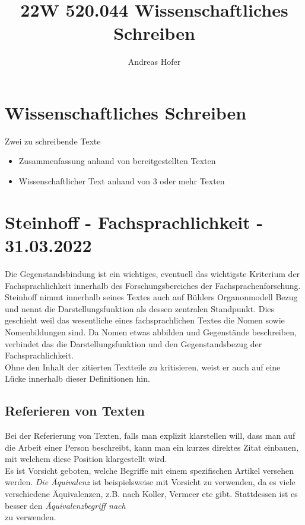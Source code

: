 \documentclass{article}
\title{22W 520.044 Wissenschaftliches Schreiben}
\author{Andreas Hofer}
\begin{document}
	\section{Wissenschaftliches Schreiben}
	Zwei zu schreibende Texte

	\begin{itemize}
		\item{Zusammenfassung anhand von bereitgestellten Texten}
		\item{Wissenschaftlicher Text anhand von 3 oder mehr Texten}
	\end{itemize}

	\section{Steinhoff - Fachsprachlichkeit - 31.03.2022}
	Die Gegenstandsbindung ist ein wichtiges, eventuell das wichtigste Kriterium der Fachsprachlichkeit innerhalb des Forschungsbereiches der Fachsprachenforschung. \\
	Steinhoff nimmt innerhalb seines Textes auch auf Bühlers Organonmodell Bezug und nennt die Darstellungsfunktion als dessen zentralen Standpunkt. Dies geschieht weil das wesentliche eines fachsprachlichen Textes die Nomen sowie Nomenbildungen sind. Da Nomen etwas abbilden und Gegenstände beschreiben, verbindet das die Darstellungsfunktion und den Gegenstandsbezug der Fachsprachlichkeit. \\
	Ohne den Inhalt der zitierten Textteile zu kritisieren, weist er auch auf eine Lücke innerhalb dieser Definitionen hin.\\
	\subsection{Referieren von Texten}
	Bei der Referierung von Texten, falls man explizit klarstellen will, dass man auf die Arbeit einer Person beschreibt, kann man ein kurzes direktes Zitat einbauen, mit welchem diese Position klargestellt wird. \\
	Es ist Vorsicht geboten, welche Begriffe mit einem spezifischen Artikel versehen werden. \textit{Die Äquivalenz} ist beispielsweise mit Vorsicht zu verwenden, da es viele verschiedene Äquivalenzen, z.B. nach Koller, Vermeer etc gibt. Stattdessen ist es besser den \textit{Äquivalenzbegriff nach \[\]} zu verwenden.\\
\end{document}
